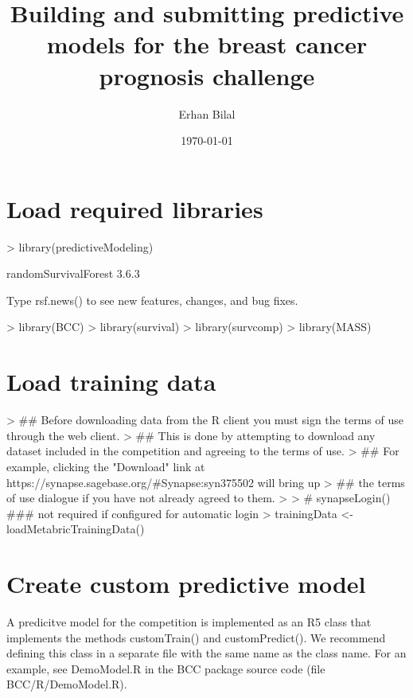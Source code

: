 \documentclass[10pt]{article}
\title{Building and submitting predictive models for the breast cancer prognosis challenge}
\author{Erhan Bilal}
\date{\today}
\begin{document}


\maketitle

\section{Load required libraries}
\begin{Schunk}
\begin{Sinput}
> library(predictiveModeling)
\end{Sinput}
\begin{Soutput}
randomSurvivalForest 3.6.3

Type rsf.news() to see new features, changes, and bug fixes.
\end{Soutput}
\begin{Sinput}
> library(BCC)
> library(survival)
> library(survcomp)
> library(MASS)
\end{Sinput}
\end{Schunk}

\section{Load training data}
\begin{Schunk}
\begin{Sinput}
> ## Before downloading data from the R client you must sign the terms of use through the web client.
> ## This is done by attempting to download any dataset included in the competition and agreeing to the terms of use.
> ## For example, clicking the "Download" link at https://synapse.sagebase.org/\#Synapse:syn375502 will bring up
> ## the terms of use dialogue if you have not already agreed to them.
> 
> # synapseLogin() ### not required if configured for automatic login
> trainingData <- loadMetabricTrainingData()
\end{Sinput}
\end{Schunk}

\section{Create custom predictive model}
A predicitve model for the competition is implemented as an R5 class that implements the methods customTrain() and customPredict(). We recommend defining this class in a separate file with the same name as the class name. For an example, see DemoModel.R in the BCC package source code (file BCC/R/DemoModel.R).
\end{document}
